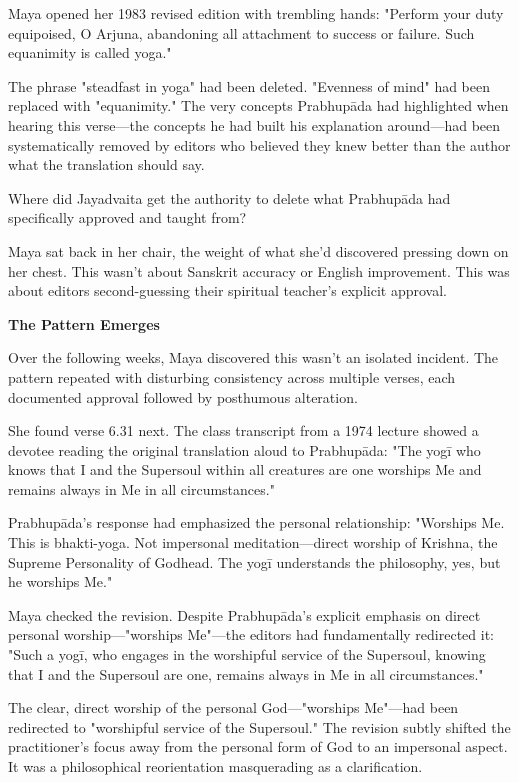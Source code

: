 \documentclass[12pt,twoside]{book}
\begin{document}
Maya opened her 1983 revised edition with trembling hands: "Perform your duty equipoised, O Arjuna, abandoning all attachment to success or failure. Such equanimity is called yoga."

The phrase "steadfast in yoga" had been deleted. "Evenness of mind" had been replaced with "equanimity." The very concepts Prabhupāda had highlighted when hearing this verse—the concepts he had built his explanation around—had been systematically removed by editors who believed they knew better than the author what the translation should say.

Where did Jayadvaita get the authority to delete what Prabhupāda had specifically approved and taught from?

Maya sat back in her chair, the weight of what she'd discovered pressing down on her chest. This wasn't about Sanskrit accuracy or English improvement. This was about editors second-guessing their spiritual teacher's explicit approval.


\vspace{0.5cm}
\textbf{The Pattern Emerges}
\vspace{0.2cm}


Over the following weeks, Maya discovered this wasn't an isolated incident. The pattern repeated with disturbing consistency across multiple verses, each documented approval followed by posthumous alteration.

She found verse 6.31 next. The class transcript from a 1974 lecture showed a devotee reading the original translation aloud to Prabhupāda: "The yogī who knows that I and the Supersoul within all creatures are one worships Me and remains always in Me in all circumstances."

Prabhupāda's response had emphasized the personal relationship: "Worships Me. This is bhakti-yoga. Not impersonal meditation—direct worship of Krishna, the Supreme Personality of Godhead. The yogī understands the philosophy, yes, but he worships Me."

Maya checked the revision. Despite Prabhupāda's explicit emphasis on direct personal worship—"worships Me"—the editors had fundamentally redirected it: "Such a yogī, who engages in the worshipful service of the Supersoul, knowing that I and the Supersoul are one, remains always in Me in all circumstances."

The clear, direct worship of the personal God—"worships Me"—had been redirected to "worshipful service of the Supersoul." The revision subtly shifted the practitioner's focus away from the personal form of God to an impersonal aspect. It was a philosophical reorientation masquerading as a clarification.
\end{document}
